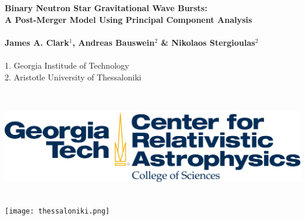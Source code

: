 \documentclass[a0,landscape]{a0poster}
\begin{document}


\begin{minipage}[b]{0.73\linewidth}
\veryHuge \color{NavyBlue} \textbf{Binary Neutron Star Gravitational Wave
Bursts:  \\A Post-Merger Model Using Principal Component Analysis} \color{Black}\\ \\%
\huge \textbf{James A. Clark$^{1}$, Andreas Bauswein$^{2}$ \& Nikolaos Stergioulas$^{2}$}\\ \\%
\large 1. Georgia Institude of Technology\\ %
\large 2. Aristotle University of Thessaloniki\\ %
\end{minipage}
%
\hspace{2.5cm}
%
\begin{minipage}[b]{0.25\linewidth}
    \includegraphics[height=5cm]{cra.png} \hspace{1cm}
\texttt{[image: thessaloniki.png]} %
~\\~\\~\\~\\~\\~\\
\end{minipage}
\end{document}
